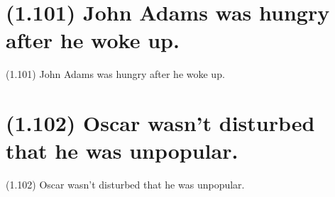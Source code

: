 \documentclass{article}
\begin{document}
\section*{(1.101) John Adams was hungry after he woke up.}

\bigbreak
\begin{enumerate*}
\item[(1.101)] John Adams was hungry after he woke up.
\end{enumerate*}
\bigbreak

\bigbreak
\begin{minipage}{\textwidth}
\end{minipage}
\bigbreak

\clearpage

%
%

\section*{(1.102) Oscar wasn't disturbed that he was unpopular.}

\bigbreak
\begin{enumerate*}
\item[(1.102)] Oscar wasn't disturbed that he was unpopular.
\end{enumerate*}
\bigbreak

\bigbreak
\begin{minipage}{\textwidth}
\end{minipage}
\bigbreak
\end{document}
